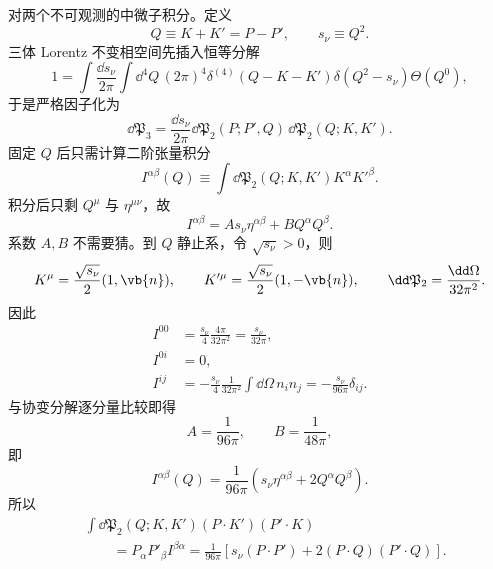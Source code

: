 \begin{derivation}[缪子衰变的自旋求和与三体相空间]
对两个不可观测的中微子积分。定义
\begin{equation*}
Q\equiv K+K'=P-P',\qquad s_\nu\equiv Q^2.
\end{equation*}
三体 Lorentz 不变相空间先插入恒等分解
\[
1=\int\frac{\dd s_\nu}{2\pi}
\int\dd^4Q\,(2\pi)^4
\delta^{(4)}(Q-K-K')\delta(Q^2-s_\nu)\Theta(Q^0),
\]
于是严格因子化为
\begin{equation*}
\dd\mathfrak P_3
=\frac{\dd s_\nu}{2\pi}
\dd\mathfrak P_2(P;P',Q)\,
\dd\mathfrak P_2(Q;K,K').
\end{equation*}
固定 $Q$ 后只需计算二阶张量积分
\begin{equation*}
I^{\alpha\beta}(Q)
\equiv\int\dd\mathfrak P_2(Q;K,K')K^\alpha K'^\beta.
\end{equation*}
积分后只剩 $Q^\mu$ 与 $\eta^{\mu\nu}$，故
\begin{equation*}
I^{\alpha\beta}=A s_\nu\eta^{\alpha\beta}+B Q^\alpha Q^\beta.
\end{equation*}
系数 $A,B$ 不需要猜。到 $Q$ 静止系，令 $\sqrt{s_\nu}>0$，则
\begin{equation*}
K^\mu=\frac{\sqrt{s_\nu}}2(1,\vb{n}),\qquad
K'^\mu=\frac{\sqrt{s_\nu}}2(1,-\vb{n}),\qquad
\dd\mathfrak P_2=\frac{\dd\Omega}{32\pi^2}.
\end{equation*}
因此
\begin{align*}
I^{00}
&=\frac{s_\nu}{4}\frac{4\pi}{32\pi^2}
=\frac{s_\nu}{32\pi},\\
I^{0i}&=0,\\
I^{ij}
&=-\frac{s_\nu}{4}\frac{1}{32\pi^2}
\int\dd\Omega\,n_in_j
=-\frac{s_\nu}{96\pi}\delta_{ij}.
\end{align*}
与协变分解逐分量比较即得
\begin{equation*}
A=\frac1{96\pi},\qquad B=\frac1{48\pi},
\end{equation*}
即
\begin{equation*}
I^{\alpha\beta}(Q)
=\frac{1}{96\pi}
\left(s_\nu\eta^{\alpha\beta}+2Q^\alpha Q^\beta\right).
\end{equation*}
所以
\begin{align*}
&\int\dd\mathfrak P_2(Q;K,K')
(P\!\cdot K')(P'\!\cdot K)\\
&\qquad=P_\alpha P'_\beta I^{\beta\alpha}
=\frac{1}{96\pi}
\left[s_\nu(P\!\cdot P')+2(P\!\cdot Q)(P'\!\cdot Q)\right].
\end{align*}


\end{derivation}

